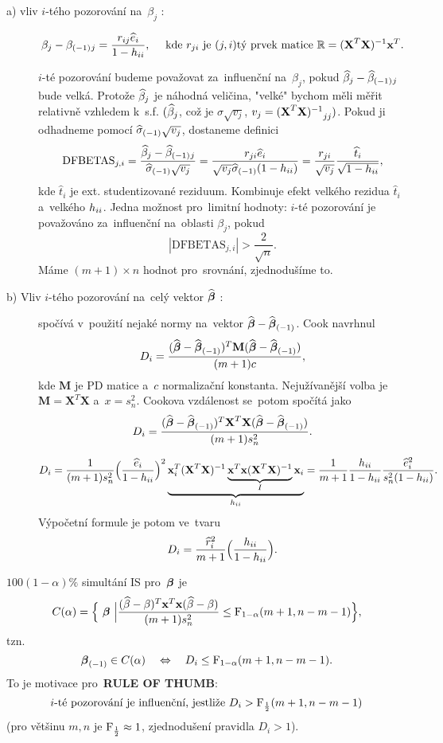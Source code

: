 \begin{description}
	\item[a) vliv $i$-tého pozorování na~$\beta_j$ :]
	 $$ \beta_j-{\beta_{(-1)}}{}_j = \frac{r_{ij}\widehat{e}_i}{1-h_{ii}},\quad\text{ kde }r_{ji}\text{ je }(j,i)\text{tý prvek matice }\mathbb{R} = {(\textbf{X}^T\textbf{X})^{-1}}\mathbf{x}^T. $$
	
	 $i$-té pozorování budeme považovat za~influenční na~$\beta_j$, pokud $\widehat{\beta}_j-{\widehat{\beta}_{(-1)}}{}_j$ bude velká. Protože $\widehat{\beta} _j$ je náhodná veličina, "velké" bychom měli měřit relativně vzhledem k~s.f. $(\widehat{\beta} _j$, což je $\sigma\sqrt{v_j}$, $v_j = {(\textbf{X}^T\textbf{X})^{-1}} _{jj})$. Pokud ji odhadneme pomocí ${\widehat{{\sigma}}_{(-1)}}\sqrt{v_j}$, dostaneme definici
	 $$ \mathrm{DFBETAS}_{j,i} = \frac{\widehat{\beta}_j-{\widehat{\beta}_{(-1)}}{}_j}{{\widehat{{\sigma}}_{(-1)}}\sqrt{v_j}} = \frac{r_{ji}\widehat{e}_i}{\sqrt{v_j}{\widehat{{\sigma}}_{(-1)}}(1-h_{ii})} = \frac{r_{ji}}{\sqrt{v_j}}\frac{\widehat{t}_i}{\sqrt{1-h_{ii}}}, $$
	kde $\widehat{t}_i$ je ext. studentizované reziduum. Kombinuje efekt velkého rezidua $\widehat{t}_i$ a~velkého $h_{ii}$. Jedna možnost pro~limitní hodnoty: $i$-té pozorování je považováno za~influenční na~oblasti $\beta_j$, pokud
	 $$ |\mathrm{DFBETAS}_{j,i}|>\frac{2}{\sqrt{n}}. $$ Máme $(m+1)\times n$ hodnot pro~srovnání, zjednodušíme to.
	\item[b) Vliv $i$-tého pozorování na~celý vektor $\widehat{\boldsymbol{\beta}}$ :]
	spočívá v~použití nejaké normy na~vektor $\widehat{\boldsymbol{\beta}}-{\widehat{\boldsymbol{\beta}}_{(-1)}}$. Cook navrhnul
	 $$ D_i = \frac{(\widehat{\boldsymbol{\beta}}-{\widehat{\boldsymbol{\beta}}_{(-1)}})^T\textbf{M}(\widehat{\boldsymbol{\beta}}-{\widehat{\boldsymbol{\beta}}_{(-1)}})}{(m+1)c}, $$
	kde $\textbf{M}$ je PD matice a~$c$ normalizační konstanta. Nejužívanější volba je $\textbf{M} = \textbf{X}^T\textbf{X}$ a~$x = s_n^2$. Cookova vzdálenost se~potom spočítá jako
	 $$ D_i = \frac{(\widehat{\boldsymbol{\beta}}-{\widehat{\boldsymbol{\beta}}_{(-1)}})^T\textbf{X}^T\textbf{X}(\widehat{\boldsymbol{\beta}}-{\widehat{\boldsymbol{\beta}}_{(-1)}})}{(m+1)s_n^2}. $$
	
	 $$ D_i = \frac{1}{(m+1)s_n^2}\Big(\frac{\widehat{e}_i}{1-h_{ii}}\Big)^2 \underbrace{\mathbf{x}_i^T{(\textbf{X}^T\textbf{X})^{-1}} \underbrace{\mathbf{x}^T\mathbf{x}{(\textbf{X}^T\textbf{X})^{-1}}}_I\mathbf{x}_i}_{h_{ii}} = \frac{1}{m+1}\frac{h_{ii}}{1-h_{ii}}\frac{\widehat{e}_i^2}{s_n^2(1-h_{ii})}. $$
	Výpočetní formule je potom ve~tvaru
	 $$ D_i = \frac{\widehat{r}_i^2}{m+1}\Big(\frac{h_{ii}}{1-h_{ii}}\Big). $$
\end{description}

\begin{remark}
	 $100(1-\alpha)\%$ simultání IS pro~$\boldsymbol{\beta}$ je $$ C(\alpha) = \Big\{ ~\boldsymbol{\beta}~\Big|\frac{(\widehat{\beta}-\beta)^T\mathbf{x}^T\mathbf{x}(\widehat{\beta}-\beta)}{(m+1)s_n^2}\leq \mathrm{F}_{1-\alpha}(m+1,n-m-1) \Big\}, $$
	tzn. $$ {\boldsymbol{\beta}_{(-1)}}\in C(\alpha)\quad \Leftrightarrow\quad D_i\leq \mathrm{F}_{1-\alpha}(m+1,n-m-1). $$
	To je motivace pro~\textbf{RULE OF THUMB}: $$ \text{ $i$-té pozorování je influenční, jestliže $D_i>\mathrm{F}_{\frac{1}{2}}(m+1,n-m-1)$ } $$ (pro většinu $m,n$ je $\mathrm{F}_{\frac{1}{2}}\approx1$, zjednodušení pravidla $D_i>1$).
\end{remark}

